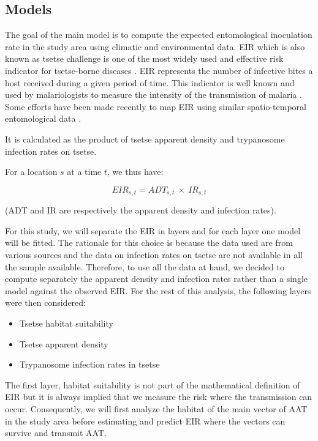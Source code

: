 \documentclass[10pt]{article}
\begin{document}
\subsection*{Models}
\label{unnumbered-8}
The goal of the main model is to compute the expected entomological inoculation rate in the study area using climatic and environmental data.
EIR which is also known as tsetse challenge is one of the most widely used and effective risk indicator for tsetse-borne diseases \cite{rogers1985trypanosomiasis}. 
EIR represents the number of infective bites a host received during a given period of time. This indicator is well known and used by malariologists to measure the intensity of the transmission of malaria \cite{smith2005entomological}.  
Some efforts have been made recently to map EIR using similar spatio-temporal entomological data \cite{rumisha2014modelling}. 

It is calculated as the product of tsetse apparent density and trypanosome infection rates on tsetse.

\noindent
For a location \(s\) at a time \(t\), we thus have:

\[
EIR_{s,t} = ADT_{s, t}\ \times\ IR_{s, t}
\]

(ADT and IR are respectively the apparent density and infection rates).

\noindent
For this study, we will separate the EIR in layers and for each layer one model will be fitted. The rationale for this choice is because the data used are from various sources
and the data on infection rates on tsetse are not available in all the sample available. Therefore, to use all the data at hand, we decided to compute separately
the apparent density and infection rates rather than a single model against the observed EIR.
For the rest of this analysis, the following layers were then considered:
\begin{itemize}
\item Tsetse habitat suitability
\item Tsetse apparent density
\item Trypanosome infection rates in tsetse
\end{itemize}
The first layer, habitat suitability is not part of the mathematical definition of EIR but it is always implied that we measure the risk where the transmission can occur. 
Consequently, we will first analyze the habitat of the main vector of AAT in the study area before estimating and predict EIR where the vectors can survive and transmit AAT.
\end{document}

